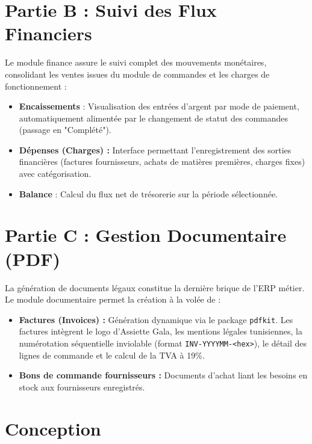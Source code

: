 \section{Partie B : Suivi des Flux Financiers}

Le module finance assure le suivi complet des mouvements monétaires, consolidant les ventes issues du module de commandes et les charges de fonctionnement :

\begin{itemize}
    \item \textbf{Encaissements} : Visualisation des entrées d'argent par mode de paiement, automatiquement alimentée par le changement de statut des commandes (passage en "Complété").
    \item \textbf{Dépenses (Charges) :} Interface permettant l'enregistrement des sorties financières (factures fournisseurs, achats de matières premières, charges fixes) avec catégorisation.
    \item \textbf{Balance} : Calcul du flux net de trésorerie sur la période sélectionnée.
\end{itemize}

\section{Partie C : Gestion Documentaire (PDF)}

La génération de documents légaux constitue la dernière brique de l'ERP métier. Le module documentaire permet la création à la volée de :

\begin{itemize}
    \item \textbf{Factures (Invoices) :} Génération dynamique via le package \texttt{pdfkit}. Les factures intègrent le logo d'Assiette Gala, les mentions légales tunisiennes, la numérotation séquentielle inviolable (format \texttt{INV-YYYYMM-<hex>}), le détail des lignes de commande et le calcul de la TVA à 19\%.
    \item \textbf{Bons de commande fournisseurs :} Documents d'achat liant les besoins en stock aux fournisseurs enregistrés.
\end{itemize}

\section{Conception}

